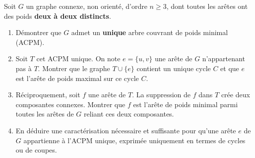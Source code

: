 \documentclass[11pt]{article}
\begin{document}
\begin{exercice}
Soit $G$ un graphe connexe, non orienté, d'ordre $n \ge 3$, dont toutes les arêtes ont des poids \textbf{deux à deux distincts}.
\begin{enumerate}
\item Démontrer que $G$ admet un \textbf{unique} arbre couvrant de poids minimal (ACPM).
\item Soit $T$ cet ACPM unique. On note $e = \{u,v\}$ une arête de $G$ n'appartenant pas à $T$. Montrer que le graphe $T \cup \{e\}$ contient un unique cycle $C$ et que $e$ est l'arête de poids maximal sur ce cycle $C$.
\item Réciproquement, soit $f$ une arête de $T$. La suppression de $f$ dans $T$ crée deux composantes connexes. Montrer que $f$ est l'arête de poids minimal parmi toutes les arêtes de $G$ reliant ces deux composantes.
\item En déduire une caractérisation nécessaire et suffisante pour qu'une arête $e$ de $G$ appartienne à l'ACPM unique, exprimée uniquement en termes de cycles ou de coupes.
\end{enumerate}
\end{exercice}
\end{document}
